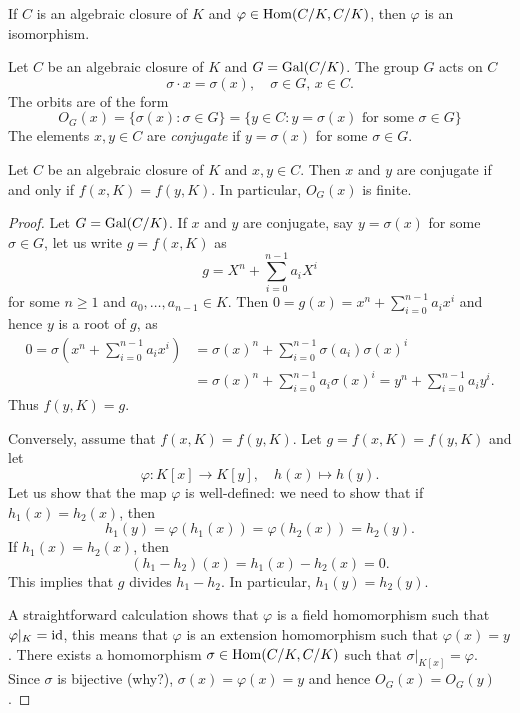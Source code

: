 \begin{exercise}
\label{xca:C/K_bijective}
If $C$ is an algebraic closure of $K$ and 
$\varphi\in\operatorname{Hom}(C/K,C/K)$, 
then $\varphi$ is an isomorphism. 
\end{exercise}


Let $C$ be an algebraic closure of $K$ and 
$G=\operatorname{Gal}(C/K)$. The group $G$ acts on $C$
\[
\sigma\cdot x=\sigma(x),\quad
\sigma\in G,\,x\in C.
\]
The orbits 
are of the form 
\[
O_G(x)=\{\sigma(x):\sigma\in G\}
=\{y\in C:y=\sigma(x)\text{ for some $\sigma\in G$}\}
\]
The elements $x,y\in C$ are \emph{conjugate} 
if $y=\sigma(x)$ for some $\sigma\in G$. 

\begin{proposition}
\label{pro:conjugate}
    Let $C$ be an algebraic closure of $K$ and $x,y\in C$. Then 
    $x$ and $y$ are conjugate if and only if $f(x,K)=f(y,K)$. In particular, 
    $O_G(x)$ is finite. 
\end{proposition}

\begin{proof}
    Let $G=\operatorname{Gal}(C/K)$. 
    If $x$ and $y$ are conjugate, say $y=\sigma(x)$ for some $\sigma\in G$, 
    let us write $g=f(x,K)$ as 
    \[
    g=X^n+\sum_{i=0}^{n-1} a_iX^i
    \]
    for some $n\geq1$ and $a_0,\dots,a_{n-1}\in K$. 
    Then $0=g(x)=x^n+\sum_{i=0}^{n-1}a_ix^i$ and hence $y$ is
    a root of $g$, as 
    \begin{align*}
    0=\sigma\left(x^n+\sum_{i=0}^{n-1}a_ix^i\right)
    &=\sigma(x)^n+\sum_{i=0}^{n-1}\sigma(a_i)\sigma(x)^i\\
    &=\sigma(x)^n+\sum_{i=0}^{n-1}a_i\sigma(x)^i
    =y^n+\sum_{i=0}^{n-1}a_iy^i.
    \end{align*}
    Thus $f(y,K)=g$. 
    
    Conversely, assume that $f(x,K)=f(y,K)$. Let
    $g=f(x,K)=f(y,K)$ and let 
    \[
    \varphi\colon K[x]\to K[y],
    \quad
    h(x)\mapsto h(y).
    \]
    Let us show that the map $\varphi$ is well-defined: we need to show 
    that if 
    $h_1(x)=h_2(x)$, then 
    \[
    h_1(y)=\varphi(h_1(x))=\varphi(h_2(x))=h_2(y).
    \]
    If $h_1(x)=h_2(x)$, then 
    \[
    (h_1-h_2)(x)=h_1(x)-h_2(x)=0.
    \]
    This implies
    that $g$ divides $h_1-h_2$. In particular, $h_1(y)=h_2(y)$.
    
    A straightforward calculation shows that $\varphi$ is a field 
    homomorphism such that $\varphi|_K=\operatorname{id}$, this means that
    $\varphi$ is 
    an extension homomorphism such that $\varphi(x)=y$. There exists a homomorphism 
    $\sigma\in\operatorname{Hom}(C/K,C/K)$ such that 
    $\sigma|_{K[x]}=\varphi$. Since $\sigma$ is bijective 
    (why?), 
    $\sigma(x)=\varphi(x)=y$ and hence 
    $O_G(x)=O_G(y)$. 
\end{proof}

